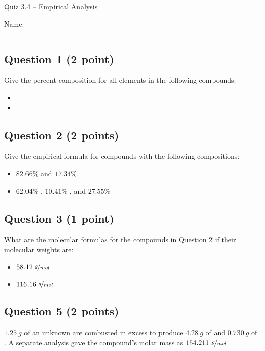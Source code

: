 \documentclass[11pt, letterpaper]{memoir}
\begin{document}
	\begin{center}
		{\large	Quiz 3.4 --  Empirical Analysis}
	\end{center}
{\large Name: \rule[-1mm]{4in}{.1pt}
	
	\subsection*{Question 1 (2 point)}
	Give the percent composition for all elements in the following compounds:
	\begin{itemize}
		\item \vspace{0.5em} 
		\item \vspace{2em} 
	\end{itemize}
	
	\vspace{1.5em}
	\subsection*{Question 2 (2 points)}
	Give the empirical formula for compounds with the following compositions:
	
	\begin{itemize}
		\item \vspace{0.5em} $82.66\%$  and $17.34\%$ 
		\item \vspace{6em} $62.04\%$ , $10.41\%$ , and $27.55\%$ 
	\end{itemize}
	
	
	\vspace{6em}
	\subsection*{Question 3 (1 point)}
	What are the molecular formulas for the compounds in Question 2 if their molecular weights are:
	\begin{itemize}
		\item \vspace{0.5em} $58.12~\nicefrac{g}{mol}$
		\item \vspace{1.5em} $116.16~\nicefrac{g}{mol}$
	\end{itemize}
	 

	\subsection*{Question 5 (2 points)}
	$1.25~g$ of an unknown are combusted in excess  to produce $4.28~g$ of  and $0.730~g$ of . A separate analysis gave the compound's molar mass as $154.211~\nicefrac{g}{mol}$
	
}
\end{document}
